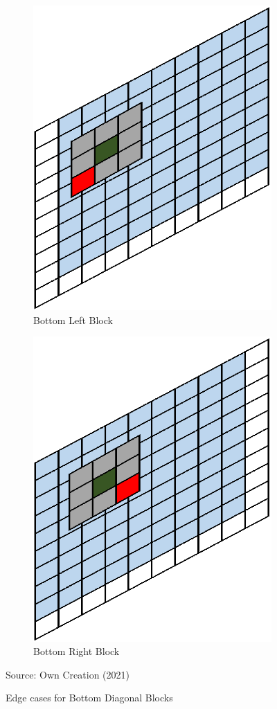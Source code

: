 \begin{figure}[H]
\centering
\begin{subfigure}{.5\textwidth}
  \centering
  \includegraphics[width=.5\linewidth]{Figures/Chapter3/botleft}
  \caption{Bottom Left Block}
\end{subfigure}%
\begin{subfigure}{.5\textwidth}
  \centering
  \includegraphics[width=.5\linewidth]{Figures/Chapter3/botright}
  \caption{Bottom Right Block}
\end{subfigure}
\caption{Edge cases for Bottom Diagonal Blocks}
\begin{center}
Source: Own Creation (2021)
\end{center}
\end{figure}

